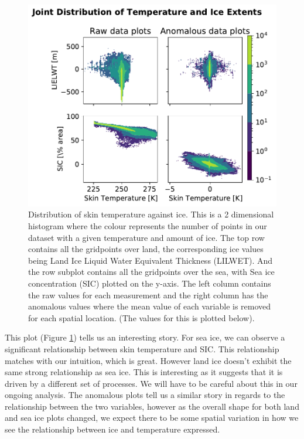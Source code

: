 \documentclass[../main.tex]{subfiles}
\begin{document}
\begin{figure}[h!]
    \centering
    \includegraphics{images/week8/hres/distribution_of_temperature_ice_both_raw_and_anomalous}
    \caption{Distribution of skin temperature against ice. This is a 2 dimensional histogram where the colour represents the number of points in our dataset with a given temperature and amount of ice. The top row contains all the gridpoints over land, the corresponding ice values being Land Ice Liquid Water Equivalent Thickness (LILWET). And the row subplot contains all the gridpoints over the sea, with Sea ice concentration (SIC) plotted on the y-axis. The left column contains the raw values for each measurement and the right column has the anomalous values where the mean value of each variable is removed for each spatial location. (The values for this is plotted below).}
    \label{fig:joint_distribuition_temp_ice}
\end{figure}

This plot (Figure \ref{fig:joint_distribuition_temp_ice}) tells us an interesting story. For sea ice, we can observe a significant relationship between skin temperature and SIC. This relationship matches with our intuition, which is great. However land ice doesn't exhibit the same strong relationship as sea ice. This is interesting as it suggests that it is driven by a different set of processes. We will have to be careful about this in our ongoing analysis. The anomalous plots tell us a similar story in regards to the relationship between the two variables, however as the overall shape for both land and sea ice plots changed, we expect there to be some spatial variation in how we see the relationship between ice and temperature expressed.
\end{document}
